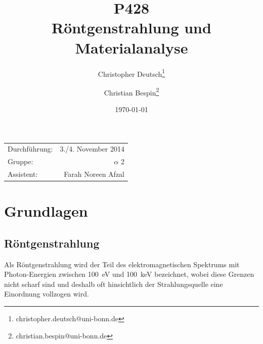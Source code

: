 \documentclass[11pt, a4paper]{article}
\title{P428 \\ Röntgenstrahlung und Materialanalyse}
\author{Christopher Deutsch\footnote{christopher.deutsch@uni-bonn.de} \and Christian Bespin\footnote{christian.bespin@uni-bonn.de}}
\date{\today}
\begin{document}
\maketitle

\begin{center}
\begin{tabular}{l r}
Durchführung: & 3./4. November 2014 \\
Gruppe: & $\alpha$ 2 \\
Assistent: & Farah Noreen Afzal
\end{tabular}
\end{center}

\begin{abstract}
\noindent
\end{abstract}

\tableofcontents
\newpage


\section{Grundlagen}
\subsection{Röntgenstrahlung}
Als Röntgenstrahlung wird der Teil des elektromagnetischen Spektrums mit Photon-Energien zwischen \SI{100}{\electronvolt} und \SI{100}{\kilo\electronvolt} bezeichnet, wobei diese Grenzen nicht scharf sind und deshalb oft hinsichtlich der Strahlungsquelle eine Einordnung vollzogen wird.
\end{document}
